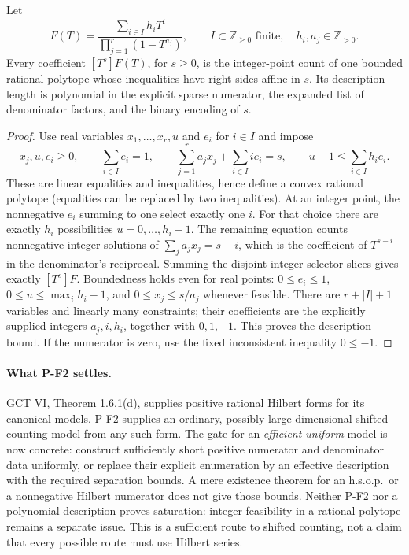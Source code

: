 \begin{proposition}
\label{prop:selector}
Let
\[
 F(T)=\frac{\sum_{i\in I}h_iT^i}{\prod_{j=1}^{r}(1-T^{a_j})},
 \qquad I\subset\mathbb Z_{\ge0}\text{ finite},\quad
 h_i,a_j\in\mathbb Z_{>0}.
\]
Every coefficient $[T^s]F(T)$, for $s\ge0$, is the integer-point count
of one bounded rational polytope whose inequalities have right sides
affine in $s$. Its description length is polynomial in the explicit
sparse numerator, the expanded list of denominator factors, and the
binary encoding of $s$.
\end{proposition}
\begin{proof}
Use real variables $x_1,\ldots,x_r,u$ and $e_i$ for $i\in I$ and impose
\[
 x_j,u,e_i\ge0,\qquad
 \sum_{i\in I}e_i=1,\qquad
 \sum_{j=1}^{r}a_jx_j+\sum_{i\in I}i e_i=s,\qquad
 u+1\le\sum_{i\in I}h_i e_i.
 \tag{P-F2}
\]
These are linear equalities and inequalities, hence define a convex
rational polytope (equalities can be replaced by two inequalities).
At an integer point, the nonnegative $e_i$ summing to one select exactly
one $i$. For that choice there are exactly $h_i$ possibilities
$u=0,\ldots,h_i-1$. The remaining equation counts nonnegative integer
solutions of $\sum_j a_jx_j=s-i$, which is the coefficient of
$T^{s-i}$ in the denominator's reciprocal. Summing the disjoint integer
selector slices gives exactly $[T^s]F$.
Boundedness holds even for real points: $0\le e_i\le1$,
$0\le u\le\max_i h_i-1$, and $0\le x_j\le s/a_j$ whenever feasible.
There are $r+|I|+1$ variables and linearly many constraints; their
coefficients are the explicitly supplied integers $a_j,i,h_i$, together
with $0,1,-1$. This proves the description bound. If the numerator is
zero, use the fixed inconsistent inequality $0\le-1$.
\end{proof}

\paragraph{What P-F2 settles.}
GCT VI, Theorem 1.6.1(d), supplies positive rational Hilbert forms for
its canonical models. P-F2 supplies an ordinary, possibly
large-dimensional shifted counting model from any such form.
The gate for an \emph{efficient uniform} model is now concrete:
construct sufficiently short positive numerator and denominator data
uniformly, or replace their explicit enumeration by an effective
description with the required separation bounds. A mere existence
theorem for an h.s.o.p.\ or a nonnegative Hilbert numerator does not give
those bounds. Neither P-F2 nor a polynomial description proves
saturation: integer feasibility in a rational polytope remains a
separate issue. This is a sufficient route to shifted counting, not a
claim that every possible route must use Hilbert series.

